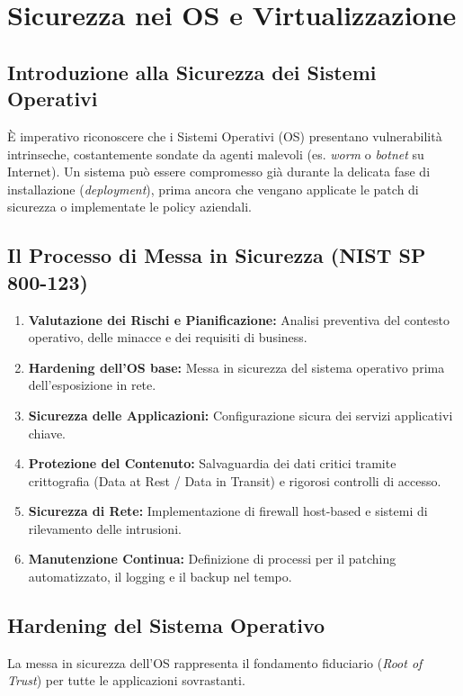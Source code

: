 \chapter{Sicurezza nei OS e Virtualizzazione}

\section{Introduzione alla Sicurezza dei Sistemi Operativi}
\begin{warnbox}
È imperativo riconoscere che i Sistemi Operativi (OS) presentano vulnerabilità intrinseche, costantemente sondate da agenti malevoli (es. \textit{worm} o \textit{botnet} su Internet). Un sistema può essere compromesso già durante la delicata fase di installazione (\textit{deployment}), prima ancora che vengano applicate le patch di sicurezza o implementate le policy aziendali.
\end{warnbox}

\section{Il Processo di Messa in Sicurezza (NIST SP 800-123)}
\begin{exbox}
\begin{enumerate}
    \item \textbf{Valutazione dei Rischi e Pianificazione:} Analisi preventiva del contesto operativo, delle minacce e dei requisiti di business.
    \item \textbf{Hardening dell'OS base:} Messa in sicurezza del sistema operativo prima dell'esposizione in rete.
    \item \textbf{Sicurezza delle Applicazioni:} Configurazione sicura dei servizi applicativi chiave.
    \item \textbf{Protezione del Contenuto:} Salvaguardia dei dati critici tramite crittografia (Data at Rest / Data in Transit) e rigorosi controlli di accesso.
    \item \textbf{Sicurezza di Rete:} Implementazione di firewall host-based e sistemi di rilevamento delle intrusioni.
    \item \textbf{Manutenzione Continua:} Definizione di processi per il patching automatizzato, il logging e il backup nel tempo.
\end{enumerate}
\end{exbox}

\section{Hardening del Sistema Operativo}
La messa in sicurezza dell'OS rappresenta il fondamento fiduciario (\textit{Root of Trust}) per tutte le applicazioni sovrastanti. 

